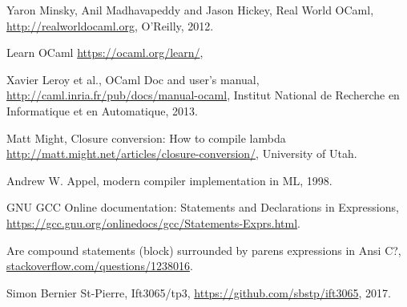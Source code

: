 \documentclass{article}
\begin{document}
\begin{thebibliography}{9}

	Yaron Minsky, Anil Madhavapeddy and Jason Hickey,
	Real World OCaml,
	\url{http://realworldocaml.org},
	O'Reilly,
	2012.

	Learn OCaml
	\url{https://ocaml.org/learn/},

	Xavier Leroy et al.,
	OCaml Doc and user's manual,
	\url{http://caml.inria.fr/pub/docs/manual-ocaml},
	Institut National de Recherche en Informatique et en Automatique,
	2013.

	Matt Might,
  Closure conversion: How to compile lambda
	\url{http://matt.might.net/articles/closure-conversion/},
  University of Utah.
  
  Andrew W. Appel,
  modern compiler implementation in ML,
  1998.

  GNU GCC Online documentation: Statements and Declarations in Expressions,
	\url{https://gcc.gnu.org/onlinedocs/gcc/Statements-Exprs.html}.

  Are compound statements (block) surrounded by parens expressions in Ansi C?,
  \url{stackoverflow.com/questions/1238016}.

  Simon Bernier St-Pierre,
  Ift3065/tp3,
	\url{https://github.com/sbstp/ift3065},
  2017.
  

\end{thebibliography}
\end{document}
